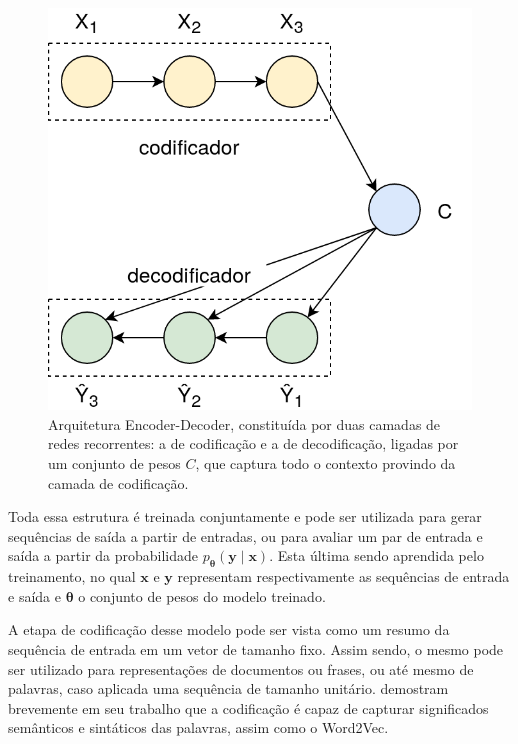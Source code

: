 \begin{figure}[h]
\begin{center} {
    \begin{center}
    \includegraphics[scale=0.30]{images/encoder_decoder.png}
    \caption{Arquitetura Encoder-Decoder, constituída por duas camadas de redes
             recorrentes: a de codificação e a de decodificação, ligadas por um
             conjunto de pesos $C$, que captura todo o contexto provindo da
             camada de codificação.}
    \label{fig:encoder_decoder}
    \end{center}
}
\end{center}
\end{figure}

Toda essa estrutura é treinada conjuntamente e pode ser utilizada para gerar
sequências de saída a partir de entradas, ou para avaliar um par de entrada e
saída a partir da probabilidade $p_{\mathbf{\theta}}(\mathbf{y} \mid \mathbf{x})$.
Esta última sendo aprendida pelo treinamento, no qual $\mathbf{x}$ e $\mathbf{y}$
representam respectivamente as sequências de entrada e saída e $\mathbf{\theta}$
o conjunto de pesos do modelo treinado.

A etapa de codificação desse modelo pode ser vista como um resumo da sequência
de entrada em um vetor de tamanho fixo.
Assim sendo, o mesmo pode ser utilizado para representações de documentos ou
frases, ou até mesmo de palavras, caso aplicada uma sequência de tamanho unitário.
\citet{cho14} demostram brevemente em seu trabalho que a codificação é capaz de
capturar significados semânticos e sintáticos das palavras, assim como o Word2Vec.

